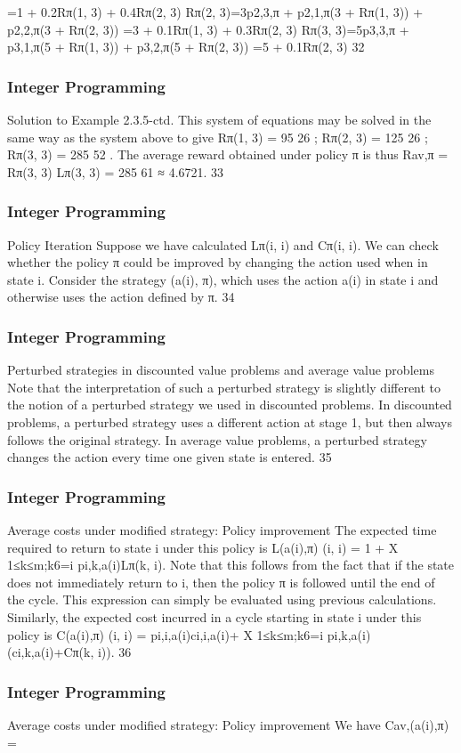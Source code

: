 \begin{frame}
=1 + 0.2Rπ(1, 3) + 0.4Rπ(2, 3)
Rπ(2, 3)=3p2,3,π + p2,1,π(3 + Rπ(1, 3)) + p2,2,π(3 + Rπ(2, 3))
=3 + 0.1Rπ(1, 3) + 0.3Rπ(2, 3)
Rπ(3, 3)=5p3,3,π + p3,1,π(5 + Rπ(1, 3)) + p3,2,π(5 + Rπ(2, 3))
=5 + 0.1Rπ(2, 3)
32 \end{frame}  \begin{frame} \frametitle{Integer Programming}     
Solution to Example 2.3.5-ctd.
This system of equations may be solved in the same way as the
system above to give
Rπ(1, 3) = 95
26
; Rπ(2, 3) = 125
26
; Rπ(3, 3) = 285
52
.
The average reward obtained under policy π is thus
Rav,π =
Rπ(3, 3)
Lπ(3, 3) =
285
61
≈ 4.6721.
33 \end{frame}  \begin{frame} \frametitle{Integer Programming}     
Policy Iteration
Suppose we have calculated Lπ(i, i) and Cπ(i, i).
We can check whether the policy π could be improved by changing
the action used when in state i.
Consider the strategy (a(i), π), which uses the action a(i) in state
i and otherwise uses the action defined by π.
34 \end{frame}  \begin{frame} \frametitle{Integer Programming}     
Perturbed strategies in discounted value problems and
average value problems
Note that the interpretation of such a perturbed strategy is slightly
different to the notion of a perturbed strategy we used in
discounted problems.
In discounted problems, a perturbed strategy uses a different
action at stage 1, but then always follows the original strategy.
In average value problems, a perturbed strategy changes the action
every time one given state is entered.
35 \end{frame}  \begin{frame} \frametitle{Integer Programming}     
Average costs under modified strategy: Policy
improvement
The expected time required to return to state i under this policy is
L(a(i),π)
(i, i) = 1 + X
1≤k≤m;k6=i
pi,k,a(i)Lπ(k, i).
Note that this follows from the fact that if the state does not
immediately return to i, then the policy π is followed until the end
of the cycle.
This expression can simply be evaluated using previous calculations.
Similarly, the expected cost incurred in a cycle starting in state i
under this policy is
C(a(i),π)
(i, i) = pi,i,a(i)ci,i,a(i)+
X
1≤k≤m;k6=i
pi,k,a(i)
(ci,k,a(i)+Cπ(k, i)).
36 \end{frame}  \begin{frame} \frametitle{Integer Programming}     
Average costs under modified strategy: Policy
improvement
We have
Cav,(a(i),π) =

\end{frame}
